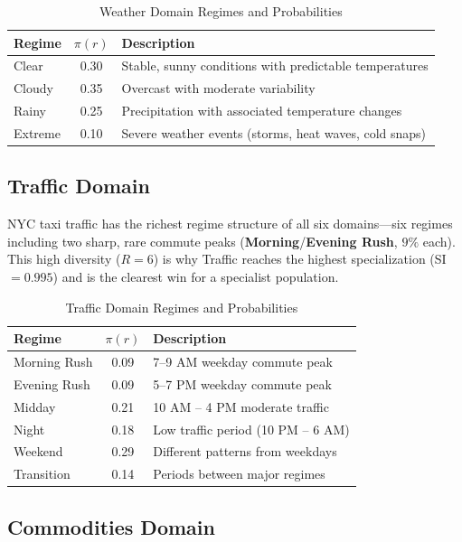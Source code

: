\documentclass[11pt,a4paper]{article}
\theoremstyle{definition}
\theoremstyle{plain}
\begin{document}
\begin{table}[H]
\centering
\caption{Weather Domain Regimes and Probabilities}
\begin{tabular}{lcp{8cm}}
\toprule
Regime & $\pi(r)$ & Description \\
\midrule
Clear & 0.30 & Stable, sunny conditions with predictable temperatures \\
Cloudy & 0.35 & Overcast with moderate variability \\
Rainy & 0.25 & Precipitation with associated temperature changes \\
Extreme & 0.10 & Severe weather events (storms, heat waves, cold snaps) \\
\bottomrule
\end{tabular}
\end{table}

\subsection{Traffic Domain}

NYC taxi traffic has the richest regime structure of all six domains---six
regimes including two sharp, rare commute peaks (\textbf{Morning}/\textbf{Evening
Rush}, $9\%$ each). This high diversity ($R=6$) is why Traffic reaches the highest
specialization (SI $=0.995$) and is the clearest win for a specialist population.

\begin{table}[H]
\centering
\caption{Traffic Domain Regimes and Probabilities}
\begin{tabular}{lcp{8cm}}
\toprule
Regime & $\pi(r)$ & Description \\
\midrule
Morning Rush & 0.09 & 7--9 AM weekday commute peak \\
Evening Rush & 0.09 & 5--7 PM weekday commute peak \\
Midday & 0.21 & 10 AM -- 4 PM moderate traffic \\
Night & 0.18 & Low traffic period (10 PM -- 6 AM) \\
Weekend & 0.29 & Different patterns from weekdays \\
Transition & 0.14 & Periods between major regimes \\
\bottomrule
\end{tabular}
\end{table}

\subsection{Commodities Domain}
\end{document}
